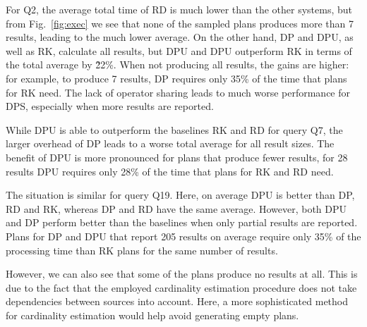 For Q2, the average total time of RD is much lower than the other
systems, but from Fig.~\ref{fig:exec} we see that none of the sampled
plans produces more than 7 results, leading to the much lower
average. On the other hand, DP and DPU, as well as RK, calculate all
results, but DPU and DPU outperform RK in terms of the total average
by \~22\%. When not producing all results, the gains are higher: for
example, to produce 7 results, DP requires only 35\% of the time that
plans for RK need. The lack of operator sharing leads to much worse
performance for DPS, especially when more results are reported.

While DPU is able to outperform the baselines RK and RD for query Q7,
the larger overhead of DP leads to a worse total average for all
result sizes. The benefit of DPU is more pronounced for plans that
produce fewer results, for 28 results DPU requires only 28\% of the
time that plans for RK and RD need.

The situation is similar for query Q19. Here, on average DPU is better
than DP, RD and RK, whereas DP and RD have the same average. However,
both DPU and DP perform better than the baselines when only partial
results are reported. Plans for DP and DPU that report 205 results on
average require only 35\% of the processing time than RK plans for the
same number of results.




However, we can also see that some of the plans produce no results at
all. This is due to the fact that the employed cardinality estimation
procedure does not take dependencies between sources into
account. Here, a more sophisticated method for cardinality estimation
would help avoid generating empty plans.

